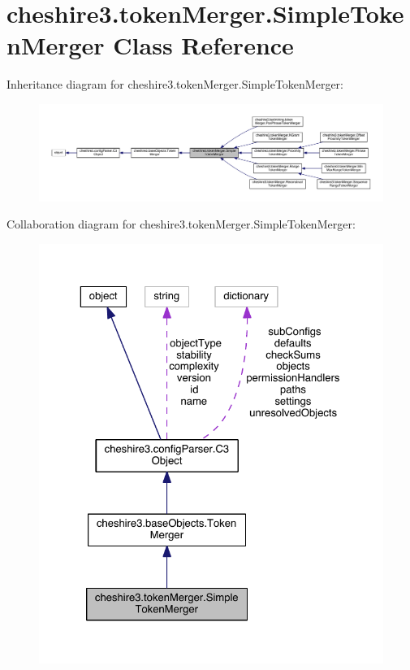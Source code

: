 \hypertarget{classcheshire3_1_1token_merger_1_1_simple_token_merger}{\section{cheshire3.\-token\-Merger.\-Simple\-Token\-Merger Class Reference}
\label{classcheshire3_1_1token_merger_1_1_simple_token_merger}
}


Inheritance diagram for cheshire3.\-token\-Merger.\-Simple\-Token\-Merger\-:
\nopagebreak
\begin{figure}[H]
\begin{center}
\leavevmode
\includegraphics[width=350pt]{classcheshire3_1_1token_merger_1_1_simple_token_merger__inherit__graph}
\end{center}
\end{figure}


Collaboration diagram for cheshire3.\-token\-Merger.\-Simple\-Token\-Merger\-:
\nopagebreak
\begin{figure}[H]
\begin{center}
\leavevmode
\includegraphics[width=325pt]{classcheshire3_1_1token_merger_1_1_simple_token_merger__coll__graph}
\end{center}
\end{figure}
